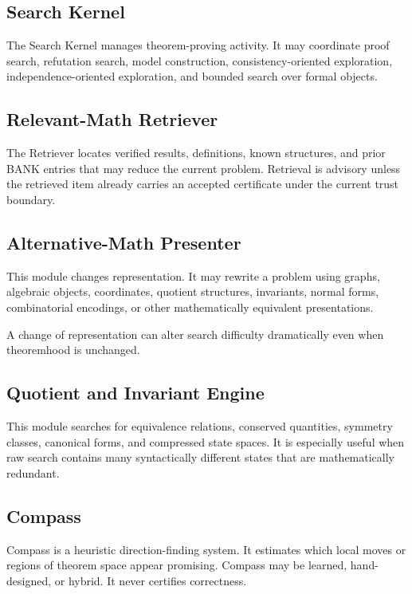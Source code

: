 \documentclass[11pt]{article}
\begin{document}
\subsection{Search Kernel}

The Search Kernel manages theorem-proving activity. It may coordinate proof search, refutation search, model construction, consistency-oriented exploration, independence-oriented exploration, and bounded search over formal objects.

\subsection{Relevant-Math Retriever}

The Retriever locates verified results, definitions, known structures, and prior BANK entries that may reduce the current problem. Retrieval is advisory unless the retrieved item already carries an accepted certificate under the current trust boundary.

\subsection{Alternative-Math Presenter}

This module changes representation. It may rewrite a problem using graphs, algebraic objects, coordinates, quotient structures, invariants, normal forms, combinatorial encodings, or other mathematically equivalent presentations.

A change of representation can alter search difficulty dramatically even when theoremhood is unchanged.

\subsection{Quotient and Invariant Engine}

This module searches for equivalence relations, conserved quantities, symmetry classes, canonical forms, and compressed state spaces. It is especially useful when raw search contains many syntactically different states that are mathematically redundant.

\subsection{Compass}

Compass is a heuristic direction-finding system. It estimates which local moves or regions of theorem space appear promising. Compass may be learned, hand-designed, or hybrid. It never certifies correctness.
\end{document}
